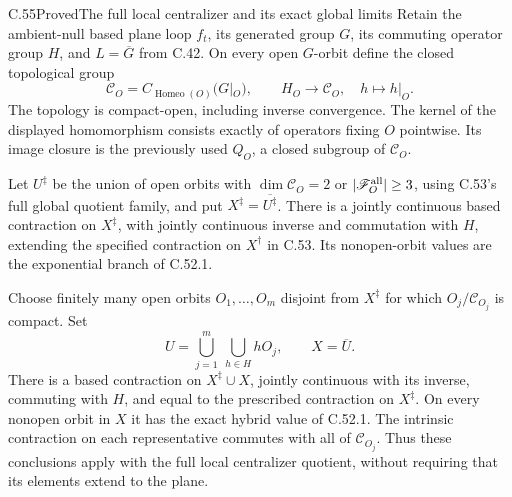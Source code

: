 \begin{claim}{C.55}{Proved}{The full local centralizer and its exact global limits}
Retain the ambient-null based plane loop $f_t$, its generated
group $G$, its commuting operator group $H$, and
$L=\overline G$ from C.42. On every open $G$-orbit define
the closed topological group
\[
 \mathcal C_O=C_{\operatorname{Homeo}(O)}(G|_O),
 \qquad H_O\longrightarrow\mathcal C_O,\quad h\longmapsto h|_O.
                                                        \tag{C.55.1}
\]
The topology is compact-open, including inverse convergence.
The kernel of the displayed homomorphism consists exactly
of operators fixing $O$ pointwise. Its image closure is
the previously used $Q_O$, a closed subgroup of
$\mathcal C_O$.

Let $U^\ddagger$ be the union of open orbits with
$\dim\mathcal C_O=2$ or
$|\mathscr F_O^{\rm all}|\geq3$, using C.53's full global
quotient family, and put $X^\ddagger=\overline{U^\ddagger}$.
There is a jointly continuous based contraction on
$X^\ddagger$, with jointly continuous inverse and
commutation with $H$, extending the specified contraction
on $X^\dagger$ in C.53. Its nonopen-orbit values are the
exponential branch of C.52.1.

Choose finitely many open orbits $O_1,\ldots,O_m$
disjoint from $X^\ddagger$ for which
$O_j/\mathcal C_{O_j}$ is compact. Set
\[
 U=\bigcup_{j=1}^{m}\ \bigcup_{h\in H}hO_j,
 \qquad X=\overline U.                                  \tag{C.55.2}
\]
There is a based contraction on $X^\ddagger\cup X$,
jointly continuous with its inverse, commuting with $H$,
and equal to the prescribed contraction on $X^\ddagger$.
On every nonopen orbit in $X$ it has the exact hybrid
value of C.52.1. The intrinsic contraction on each
representative commutes with all of $\mathcal C_{O_j}$.
Thus these conclusions apply with the full local
centralizer quotient, without requiring that its
elements extend to the plane.
\end{claim}

